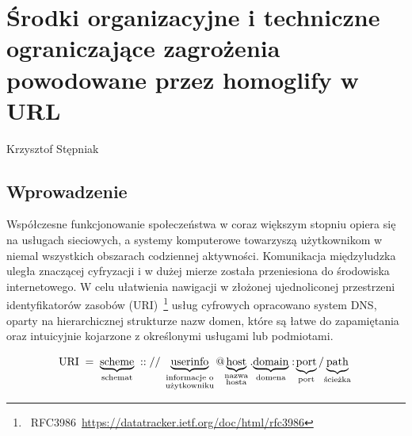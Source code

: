 \chapter[Środki organizacyjne \ldots]{Środki organizacyjne i techniczne ograniczające zagrożenia powodowane przez homoglify w URL}
\label{intro} %

\thispagestyle{empty}
\vspace{-8mm} {\large Krzysztof Stępniak} \vspace{8mm}

\section{Wprowadzenie}
Współczesne funkcjonowanie społeczeństwa w coraz większym stopniu opiera się na usługach sieciowych, a systemy komputerowe towarzyszą użytkownikom w niemal wszystkich obszarach codziennej aktywności. Komunikacja międzyludzka uległa znaczącej cyfryzacji i w dużej mierze została przeniesiona do środowiska internetowego. W celu ułatwienia nawigacji w złożonej ujednoliconej przestrzeni identyfikatorów zasobów (URI)~\footnote{~RFC3986~\url{https://datatracker.ietf.org/doc/html/rfc3986}} usług cyfrowych opracowano system DNS, oparty na hierarchicznej strukturze nazw domen, które są łatwe do zapamiętania oraz intuicyjnie kojarzone z określonymi usługami lub podmiotami.


\begin{equation} \label{eq12.1:Schemat URI} 
\text{URI} \;=\;
\underbrace{\text{scheme}}_{\text{schemat}}
\;:://\;
\underbrace{\text{userinfo}}_{\substack{\text{informacje o} \\ \text{użytkowniku}}}
@\!
\underbrace{\text{host}}_{\substack{\text{nazwa} \\ \text{hosta}}}
.\!
\underbrace{\text{domain}}_{\text{domena}}
:\!
\underbrace{\text{port}}_{\text{port}}
/\!
\underbrace{\text{path}}_{\text{ścieżka}} \\
\end{equation}

